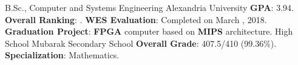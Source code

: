 \documentclass[letterpaper]{twentysecondcv} %
\begin{document}
\begin{twenty} %
               {B.Sc., Computer and Systems Engineering}
               {Alexandria University}
               {\textbf{GPA}: 3.94.\newline
                \textbf{Overall Ranking}: \underline{}.\newline
                \textbf{WES Evaluation}: Completed on March , 2018.\newline
                \textbf{Graduation Project}: \textbf{FPGA} computer based on \textbf{MIPS} architecture.\newline
               }
               {High School}
               {Mubarak Secondary School}
               {\textbf{Overall Grade}: 407.5/410 (99.36\%).\newline
                \textbf{Specialization}: Mathematics.}
\end{twenty}



\end{document}
